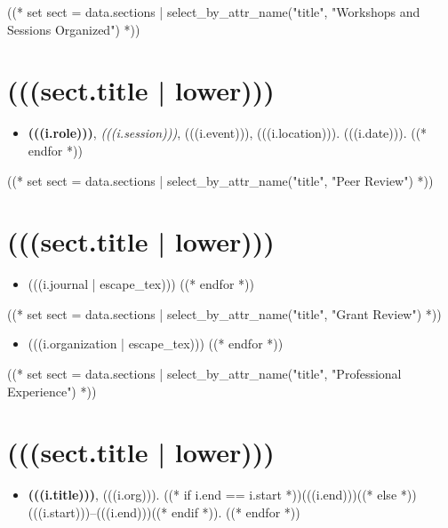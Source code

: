 \documentclass[10pt,oneside]{article}
\begin{document}
((* set sect = data.sections | select_by_attr_name("title", "Workshops and Sessions Organized") *))
\section{(((sect.title | lower)))}

\mbox{}\vspace{-\dimexpr\baselineskip\relax}

\begin{itemize}[label={}]
  ((* for i in sect.entries.convene | sort(attribute="date", reverse=True) *))
  \item \textbf{(((i.role)))}, \textit{(((i.session)))}, (((i.event))), (((i.location))). (((i.date))).
        ((* endfor *))
\end{itemize}

((* set sect = data.sections | select_by_attr_name("title", "Peer Review") *))
\section{(((sect.title | lower)))}

\mbox{}\vspace{-\dimexpr\baselineskip\relax}

\begin{itemize}[label={}]
  ((* for i in sect.entries.peerreview | sort(attribute="journal") *))
  \item (((i.journal | escape_tex)))
        ((* endfor *))
\end{itemize}

((* set sect = data.sections | select_by_attr_name("title", "Grant Review") *))

\mbox{}\vspace{-\dimexpr\baselineskip\relax}

\begin{itemize}[label={}]
  ((* for i in sect.entries.grantreview | sort(attribute="organization") *))
  \item (((i.organization | escape_tex)))
        ((* endfor *))
\end{itemize}

((* set sect = data.sections | select_by_attr_name("title", "Professional Experience") *))
\section{(((sect.title | lower)))}

\mbox{}\vspace{-\dimexpr\baselineskip\relax}

\begin{itemize}[label={}]
  ((* for i in sect.entries.experience | sort_by_attr(["end", "start"], reverse=True) *))
  \item \textbf{(((i.title)))}, (((i.org))). ((* if i.end == i.start *))(((i.end)))((* else *))(((i.start)))--(((i.end)))((* endif *)).
        ((* endfor *))
\end{itemize}
\end{document}
